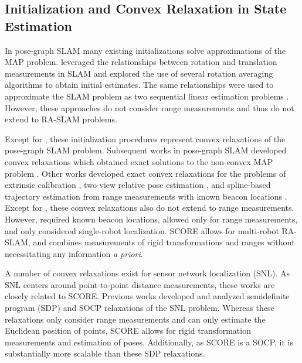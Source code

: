 \subsection{Initialization and Convex Relaxation in State Estimation}

In pose-graph SLAM many existing initializations solve approximations of the MAP
problem. \cite{carlone15aicra} leveraged the relationships between rotation and
translation measurements in SLAM and explored the use of several rotation
averaging algorithms
\cite{martinec07cvpr,govindu01cvpr,fredriksson13lnsc,tron14tac} to obtain
initial estimates. The same relationships were used to approximate the SLAM
problem as two sequential linear estimation problems \cite{carlone14ijrr}.
However, these approaches do not consider range measurements and thus do not
extend to RA-SLAM problems.

Except for \cite{tron14tac}, these initialization procedures
represent convex relaxations of the pose-graph SLAM problem. Subsequent works in
pose-graph SLAM developed convex relaxations which obtained exact solutions to
the non-convex MAP problem \cite{rosen19ijrr,
carlone15iros,briales17ral,tron15rssworkshop, fan20tro }. Other works developed
exact convex relaxations for the problems of extrinsic calibration
\cite{giamou19ral}, two-view relative pose estimation
\cite{briales18cvpr,garcia-salguero21ivc}, and spline-based trajectory
estimation from range measurements with known beacon locations
\cite{pacholska20ral}. Except for \cite{pacholska20ral}, these convex
relaxations also do not extend to range measurements. However,
\cite{pacholska20ral} required known beacon locations, allowed only for range
measurements, and only considered single-robot localization. SCORE allows for
multi-robot RA-SLAM, and combines measurements of rigid transformations and
ranges without necessitating any information \textit{a priori}.

A number of convex relaxations exist for sensor network localization (SNL). As
SNL centers around point-to-point distance measurements, these works are closely
related to SCORE. Previous works  developed and analyzed semidefinite
program (SDP) \cite{biswas06tase,
so07mathematicalprogramming, shamsi13dgo} and SOCP \cite{tseng07siam,naddafzadeh-shirazi14twc,doherty01infocom,
srirangarajan08twc}
relaxations of the SNL problem. Whereas these relaxations only
consider range measurements and can only estimate the Euclidean position of
points, SCORE allows for rigid transformation measurements and estimation of
poses. Additionally, as SCORE is a SOCP, it is substantially more scalable than
these SDP relaxations.


